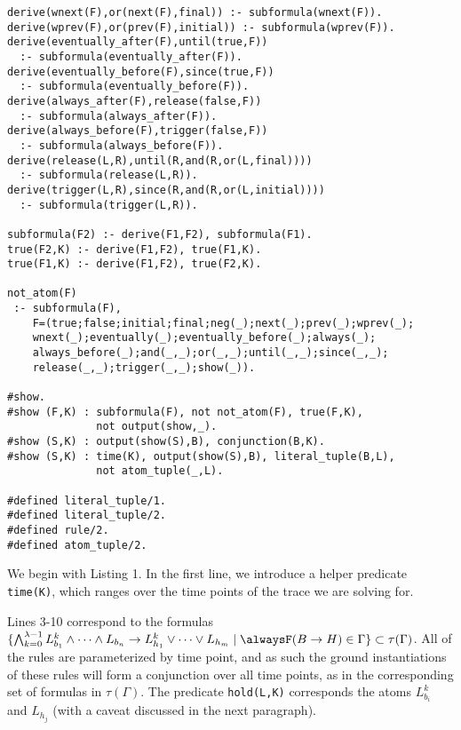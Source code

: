 \begin{center}
\begin{minipage}{\linewidth}
  \begin{lstlisting}[language=clingo, label={lst:meta-telingo2}]
derive(wnext(F),or(next(F),final)) :- subformula(wnext(F)).
derive(wprev(F),or(prev(F),initial)) :- subformula(wprev(F)).
derive(eventually_after(F),until(true,F)) 
  :- subformula(eventually_after(F)).
derive(eventually_before(F),since(true,F)) 
  :- subformula(eventually_before(F)).
derive(always_after(F),release(false,F)) 
  :- subformula(always_after(F)).
derive(always_before(F),trigger(false,F)) 
  :- subformula(always_before(F)).
derive(release(L,R),until(R,and(R,or(L,final)))) 
  :- subformula(release(L,R)).
derive(trigger(L,R),since(R,and(R,or(L,initial)))) 
  :- subformula(trigger(L,R)).

subformula(F2) :- derive(F1,F2), subformula(F1).
true(F2,K) :- derive(F1,F2), true(F1,K).
true(F1,K) :- derive(F1,F2), true(F2,K).

not_atom(F) 
 :- subformula(F), 
    F=(true;false;initial;final;neg(_);next(_);prev(_);wprev(_);
    wnext(_);eventually(_);eventually_before(_);always(_);
    always_before(_);and(_,_);or(_,_);until(_,_);since(_,_);
    release(_,_);trigger(_,_);show(_)).

#show.
#show (F,K) : subformula(F), not not_atom(F), true(F,K), 
              not output(show,_).
#show (S,K) : output(show(S),B), conjunction(B,K).
#show (S,K) : time(K), output(show(S),B), literal_tuple(B,L), 
              not atom_tuple(_,L).

#defined literal_tuple/1.
#defined literal_tuple/2.
#defined rule/2.
#defined atom_tuple/2.
\end{lstlisting}
\end{minipage}
\end{center}

We begin with Listing 1. In the first line, we introduce a helper
predicate \verb|time(K)|, which ranges over the time points of the trace we
are solving for. 

Lines 3-10 correspond to the formulas
$\{ \bigwedge_{k=0}^{\lambda-1} L_{b_1}^k \land \dots \land L_{b_n}
\rightarrow L_{h_1}^k \lor \dots \lor L_{h_m} \mid \tempruleshort \in
\Gamma \} \subset \tau(\Gamma)$. All of the rules are parameterized by
time point, and as such the ground instantiations of these rules will
form a conjunction over all time points, as in the corresponding set
of formulas in $\tau(\Gamma)$. The predicate \verb|hold(L,K)|
corresponds the atoms $L_{b_i}^k$ and $L_{h_j}$ (with a caveat
discussed in the next paragraph).

